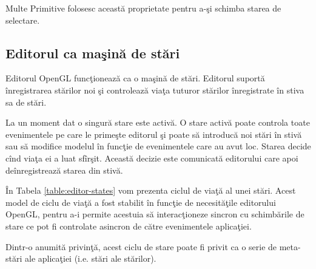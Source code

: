 Multe Primitive folosesc această proprietate pentru a-şi schimba starea de 
selectare.

\subsection{Editorul ca maşină de stări}

Editorul OpenGL funcţionează ca o maşină de stări. Editorul suportă 
înregistrarea stărilor noi şi controlează viaţa tuturor stărilor înregistrate 
în stiva sa de stări.

La un moment dat o singură stare este activă. O stare activă poate controla 
toate evenimentele pe care le primeşte editorul şi poate să introducă noi stări 
în stivă sau să modifice modelul în funcţie de evenimentele care au avut loc. 
Starea decide cînd viaţa ei a luat sfîrşit. Această decizie este comunicată 
editorului care apoi deînregistrează starea din stivă.

În Tabela \ref{table:editor-states} vom prezenta ciclul de viaţă al unei stări. 
Acest model de ciclu de viaţă a fost stabilit în funcţie de necesităţile 
editorului OpenGL, pentru a-i permite acestuia să interacţioneze sincron cu 
schimbările de stare ce pot fi controlate asincron de către evenimentele 
aplicaţiei.

Dintr-o anumită privinţă, acest ciclu de stare poate fi privit ca o serie de 
meta-stări ale aplicaţiei (i.e. stări ale stărilor).

